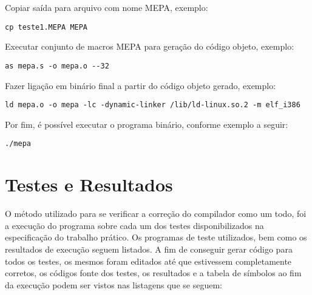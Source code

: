 \documentclass[12pt,a4paper]{article}
\begin{document}
Copiar saída para arquivo com nome MEPA, exemplo:
\begin{verbatim}
cp teste1.MEPA MEPA
\end{verbatim}
Executar conjunto de macros MEPA para geração do código objeto, exemplo:
\begin{verbatim}
as mepa.s -o mepa.o --32
\end{verbatim}
Fazer ligação em binário final a partir do código objeto gerado, exemplo:
\begin{verbatim}
ld mepa.o -o mepa -lc -dynamic-linker /lib/ld-linux.so.2 -m elf_i386
\end{verbatim}
Por fim, é possível executar o programa binário, conforme exemplo a seguir:
\begin{verbatim}
./mepa
\end{verbatim}



\section{Testes e Resultados}

O método utilizado para se verificar a correção do compilador como um todo, foi a execução do programa sobre cada um dos testes disponibilizados na especificação do trabalho prático. Os programas de teste utilizados, bem como os resultados de execução seguem listados. A fim de conseguir gerar código para todos os testes, os mesmos foram editados até que estivessem completamente corretos, os códigos fonte dos testes, os resultados e a tabela de símbolos ao fim da execução podem ser vistos nas listagens que se seguem:


\smallskip

\smallskip


\smallskip

\smallskip

\smallskip

\end{document}

